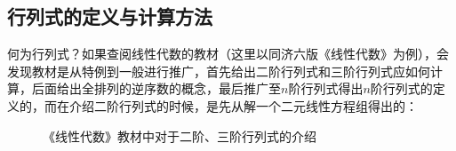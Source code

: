 \documentclass[12pt, a4paper, oneside, UTF8]{ctexbook}
\begin{document}
\subsection{行列式的定义与计算方法}
何为行列式？如果查阅线性代数的教材（这里以同济六版《线性代数》为例），会发现教材是从特例到一般进行推广，首先给出二阶行列式和三阶行列式应如何计算，后面给出全排列的逆序数的概念，最后推广至$n$阶行列式得出$n$阶行列式的定义的，而在介绍二阶行列式的时候，是先从解一个二元线性方程组得出的：
\begin{figure}[h]
    \centering
    \caption{《线性代数》教材中对于二阶、三阶行列式的介绍}
\end{figure}
\end{document}
